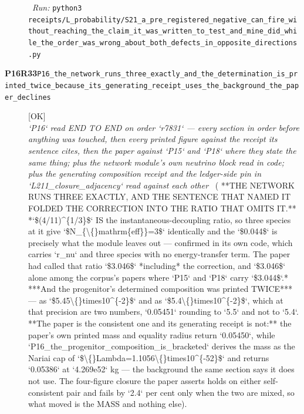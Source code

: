 \begin{description}
\ \emph{Run:} \texttt{python3 receipts/L\_probability/S21\_a\_pre\_registered\_negative\_can\_fire\_without\_reaching\_the\_claim\_it\_was\_written\_to\_test\_and\_mine\_did\_while\_the\_order\_was\_wrong\_about\_both\_defects\_in\_opposite\_directions.py}
\item[\rcptlabel{P16_the_network_runs_three_exactly_and_the_determination_is_printed_twice_because_its_generating_receipt_uses_the_background_the_paper_declines}{P16R33}\textbf{P16R33}\quad\texttt{P16\_the\_network\_runs\_three\_exactly\_and\_the\_determination\_is\_printed\_twice\_because\_its\_generating\_receipt\_uses\_the\_background\_the\_paper\_declines}]\hfill\textsf{[OK]}\\
\textit{`P16` read END TO END on order `r7831` --- every section in order before anything was touched, then every printed figure against the receipt its sentence cites, then the paper against `P15` and `P18` where they state the same thing; plus the network module's own neutrino block read in code; plus the generating composition receipt and the ledger-side pin in `L211\_closure\_adjacency` read against each other} \ ( **THE NETWORK RUNS THREE EXACTLY, AND THE SENTENCE THAT NAMED IT FOLDED THE CORRECTION INTO THE RATIO THAT OMITS IT.** *`\$(4/11)\textasciicircum{}\{1/3\}\$` IS the instantaneous-decoupling ratio, so three species at it give `\$N\_\{\textbackslash\{\}mathrm\{eff\}\}=3\$` identically and the `\$0.044\$` is precisely what the module leaves out --- confirmed in its own code, which carries `r\_nu` and three species with no energy-transfer term. The paper had called that ratio `\$3.046\$` *including* the correction, and `\$3.046\$` alone among the corpus's papers where `P15` and `P18` carry `\$3.044\$`.*  ***And the progenitor's determined composition was printed TWICE*** --- as `\$5.45\textbackslash\{\}times10\textasciicircum{}\{-2\}\$` and as `\$5.4\textbackslash\{\}times10\textasciicircum{}\{-2\}\$`, which at that precision are two numbers, `0.05451` rounding to `5.5` and not to `5.4`.  **The paper is the consistent one and its generating receipt is not:** the paper's own printed mass and equality radius return `0.05450`, while `P16\_the\_progenitor\_composition\_is\_bracketed` derives the mass as the Nariai cap of `\$\textbackslash\{\}Lambda=1.1056\textbackslash\{\}times10\textasciicircum{}\{-52\}\$` and returns `0.05386` at `4.269e52` kg --- the background the same section says it does not use. The four-figure closure the paper asserts holds on either self-consistent pair and fails by `2.4` per cent only when the two are mixed, so what moved is the MASS and nothing else). 

\end{description}
